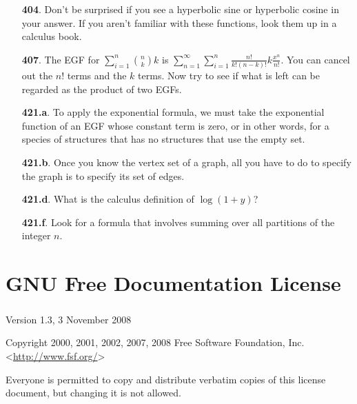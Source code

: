\documentclass[10pt,]{book}
\theoremstyle{plain}
\theoremstyle{definition}
\theoremstyle{definition}
\numberwithin{equation}{chapter}
\begin{document}
\begin{itemize}[itemsep=1em]
\item[\textbf{404}.]Don't be surprised if you see a hyperbolic sine or hyperbolic cosine in your answer. If you aren't familiar with these functions, look them up in a calculus book.%

\item[\textbf{407}.]The EGF for \(\sum_{i=1}^n\binom{n}{k}k\) is \(\sum_{n=1}^\infty \sum_{i=1}^n \frac{n!}{k!(n-k)!}k\frac{x^n}{n!}\).  You can cancel out the \(n!\) terms and the \(k\) terms.  Now try to see if what is left can be regarded as the product of two EGFs.%

\item[\textbf{421.a}.]To apply the exponential formula, we must take the exponential function of an EGF whose constant term is zero, or in other words, for a species of structures that has no structures that use the empty set.%

\item[\textbf{421.b}.]Once you know the vertex set of a graph, all you have to do to specify the graph is to specify its set of edges.%

\item[\textbf{421.d}.]What is the calculus definition of \(\log(1+y)\)?%

\item[\textbf{421.f}.]Look for a formula that involves summing over all partitions of the integer \(n\).%

\end{itemize}
%
\printindex
%
\typeout{************************************************}
\typeout{************************************************}
\chapter[{GNU Free Documentation License}]{GNU Free Documentation License}\label{appendix-gfdl}
\typeout{************************************************}
\typeout{************************************************}
\paragraph[{}]{}\hypertarget{paragraphs-1}{}
Version 1.3, 3 November 2008%
\par
Copyright \textcopyright{} 2000, 2001, 2002, 2007, 2008 Free Software Foundation, Inc. \textless{}\url{http://www.fsf.org/}\textgreater{}%
\par
Everyone is permitted to copy and distribute verbatim copies of this license document, but changing it is not allowed.%
\typeout{************************************************}
\typeout{************************************************}
\end{document}
